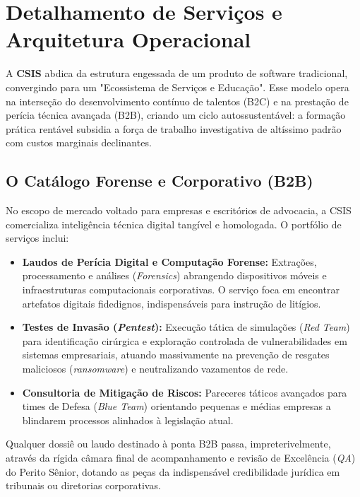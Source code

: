 \documentclass[../main.tex]{subfiles}
\begin{document}
\section{Detalhamento de Serviços e Arquitetura Operacional}

A \textbf{CSIS} abdica da estrutura engessada de um produto de software tradicional, convergindo para um "Ecossistema de Serviços e Educação". Esse modelo opera na interseção do desenvolvimento contínuo de talentos (B2C) e na prestação de perícia técnica avançada (B2B), criando um ciclo autossustentável: a formação prática rentável subsidia a força de trabalho investigativa de altíssimo padrão com custos marginais declinantes.

\subsection{O Catálogo Forense e Corporativo (B2B)}
No escopo de mercado voltado para empresas e escritórios de advocacia, a CSIS comercializa inteligência técnica digital tangível e homologada. O portfólio de serviços inclui:
\begin{itemize}
    \item \textbf{Laudos de Perícia Digital e Computação Forense:} Extrações, processamento e análises (\textit{Forensics}) abrangendo dispositivos móveis e infraestruturas computacionais corporativas. O serviço foca em encontrar artefatos digitais fidedignos, indispensáveis para instrução de litígios.
    \item \textbf{Testes de Invasão (\textit{Pentest}):} Execução tática de simulações (\textit{Red Team}) para identificação cirúrgica e exploração controlada de vulnerabilidades em sistemas empresariais, atuando massivamente na prevenção de resgates maliciosos (\textit{ransomware}) e neutralizando vazamentos de rede.
    \item \textbf{Consultoria de Mitigação de Riscos:} Pareceres táticos avançados para times de Defesa (\textit{Blue Team}) orientando pequenas e médias empresas a blindarem processos alinhados à legislação atual.
\end{itemize}

Qualquer dossiê ou laudo destinado à ponta B2B passa, impreterivelmente, através da rígida câmara final de acompanhamento e revisão de Excelência (\textit{QA}) do Perito Sênior, dotando as peças da indispensável credibilidade jurídica em tribunais ou diretorias corporativas.
\end{document}
